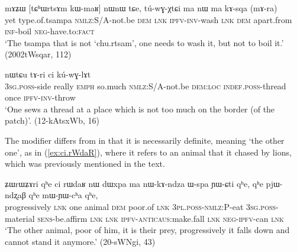 
\begin{exe}
\ex \label{ex:tChWrtsAm.kWmaR}
\gll mɤʑɯ [tɕʰɯrtsɤm kɯ-maʁ] nɯnɯ tɕe, tú-wɣ-χtɕi ma nɯ ma kɤ-sqa (mɤ-ra) \\
yet type.of.tsampa \textsc{nmlz}:S/A-not.be \textsc{dem} \textsc{lnk} \textsc{ipfv}-\textsc{inv}-wash \textsc{lnk} \textsc{dem} apart.from \textsc{inf}-boil \textsc{neg}-have.to:\textsc{fact} \\
\glt `The tsampa that is not `chu.rtsam', one needs to wash it, but not to boil it.' (2002tWsqar, 112)
\end{exe}

\begin{exe}
\ex \label{ex:sthWci.kWmaR}
 nɯtɕu tɤ-ri ci kú-wɣ-lɤt \\
\textsc{3sg}.\textsc{poss}-side really \textsc{emph} so.much \textsc{nmlz}:S/A-not.be \textsc{dem}:\textsc{loc} \textsc{indef}.\textsc{poss}-thread once \textsc{ipfv}-\textsc{inv}-throw \\
\glt `One sews a thread at a place which is not too much on the border (of the patch)'. (12-kAtsxWb, 16)
\end{exe}

The modifier  differs from  in that it is necessarily definite, meaning `the other one', as in (\ref{ex:ci.rWdaR}), where it refers to an animal that it chased by lions, which was previously mentioned in the text.

\begin{exe}
\ex \label{ex:ci.rWdaR}
\gll ʑɯrɯʑɤri qʰe ci rɯdaʁ nɯ dɯxpa ma nɯ-kɤ-ndza ɯ-spa ɲɯ-ɕti qʰe, qʰe pjɯ-ndʐaβ qʰe mɯ-ɲɯ-cʰa qʰe, \\
progressively \textsc{lnk} one animal \textsc{dem} poor.of \textsc{lnk} \textsc{3pl}.\textsc{poss}-\textsc{nmlz}:P-eat \textsc{3sg}.\textsc{poss}-material \textsc{sens}-be.affirm \textsc{lnk} \textsc{lnk} \textsc{ipfv}-\textsc{anticaus}:make.fall \textsc{lnk} \textsc{neg}-\textsc{ipfv}-can \textsc{lnk} \\
\glt `The other animal, poor of him, it is their prey, progressively it falls down and cannot stand it anymore.' (20-sWNgi, 43)
\end{exe}

